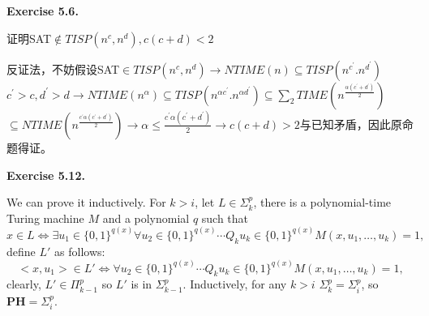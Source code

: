 \documentclass[a4paper]{article}
\newenvironment{exercise}[1]{
	\par
	\noindent\textbf{Exercise #1.}\quad
}{
	\par
	\bigskip
}
\begin{document}
\begin{exercise}{5.6}
    证明SAT$\notin TISP(n^c,n^d),c(c+d)<2$

    反证法，不妨假设SAT$\in TISP(n^c,n^d)\to NTIME(n)\subseteq TISP(n^{c^{'}}.n^{d^{'}})$$c^{'}>c,d^{'}>d\to NTIME(n^\alpha)\subseteq TISP(n^{\alpha c^{'}}.n^{\alpha d^{'}})\subseteq \sum_2TIME(n^{\frac{\alpha(c^{'}+d^{'})}{2}})$$\subseteq NTIME(n^{\frac{c^{'}\alpha(c^{'}+d^{'})}{2}})\to \alpha \le \frac{c^{'}\alpha(c^{'}+d^{'}) }{2}\to c(c+d)>2$与已知矛盾，因此原命题得证。
\end{exercise}

\begin{exercise}{5.12}
We can prove it inductively. For $k>i$, let $L\in\Sigma_k^p$, there is a polynomial-time Turing machine $M$ and a polynomial $q$ such that
$$
x\in L\Leftrightarrow\exists u_1\in\{0,1\}^{q(x)}\forall u_2\in\{0,1\}^{q(x)}\cdots Q_k u_k\in\{0,1\}^{q(x)}M(x,u_1,\dots,u_k)=1,
$$
define $L'$ as follows:
$$
<x,u_1>\in L'\Leftrightarrow\forall u_2\in\{0,1\}^{q(x)}\cdots Q_k u_k\in\{0,1\}^{q(x)}M(x,u_1,\dots,u_k)=1,
$$
clearly, $L'\in\Pi_{k-1}^p$ so $L'$ is in $\Sigma_{k-1}^p$. Inductively, for any $k>i$ $\Sigma_k^p=\Sigma_i^p$, so $\textbf{PH}=\Sigma_i^p$.
\end{exercise}
\end{document}
